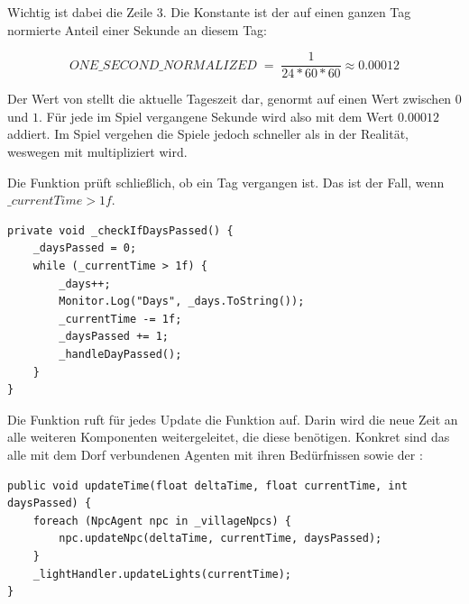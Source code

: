 Wichtig ist dabei die Zeile 3. Die Konstante  ist der auf einen ganzen Tag normierte Anteil einer Sekunde an diesem Tag:

$$ ONE\_SECOND\_NORMALIZED \;=\; \frac{1}{24 * 60 * 60} \approx 0.00012 $$

Der Wert von  stellt die aktuelle Tageszeit dar, genormt auf einen Wert zwischen $0$ und $1$. Für jede im Spiel vergangene Sekunde wird  also mit dem Wert $0.00012$ addiert. Im Spiel vergehen die Spiele jedoch schneller als in der Realität, weswegen  mit  multipliziert wird.

Die Funktion  prüft schließlich, ob ein Tag vergangen ist. Das ist der Fall, wenn $\_currentTime > 1f$.

\begin{minipage}{\linewidth}
\begin{lstlisting}[linewidth=16.4cm, label=lst:village_timecontroller_checkIfDaysPassed, caption=Funktion \inlinecode{\_checkIfDaysPassed} im \inlinecode{TimeController}, xleftmargin=1cm]
private void _checkIfDaysPassed() {
    _daysPassed = 0;
    while (_currentTime > 1f) {
        _days++;
        Monitor.Log("Days", _days.ToString());
        _currentTime -= 1f;
        _daysPassed += 1;
        _handleDayPassed();
    }
}
\end{lstlisting}
\end{minipage}

Die Funktion  ruft für jedes Update die Funktion  auf. Darin wird die neue Zeit an alle weiteren Komponenten weitergeleitet, die diese benötigen. Konkret sind das alle mit dem Dorf verbundenen Agenten mit ihren Bedürfnissen sowie der :

\begin{minipage}{\linewidth}
\begin{lstlisting}[linewidth=16.4cm, label=lst:village_timecontroller_updatetime, caption=Funktion \inlinecode{updateTime} im \inlinecode{TimeController}, xleftmargin=1cm]
public void updateTime(float deltaTime, float currentTime, int daysPassed) {
    foreach (NpcAgent npc in _villageNpcs) {
        npc.updateNpc(deltaTime, currentTime, daysPassed);
    }
    _lightHandler.updateLights(currentTime);
}
\end{lstlisting}
\end{minipage}

